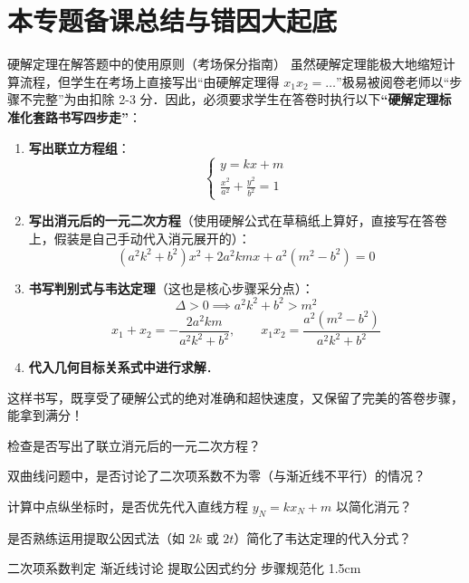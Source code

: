 \documentclass[11pt,a4paper]{ctexart}
\begin{document}
\newpage

\section{本专题备课总结与错因大起底}

\begin{keybox}{硬解定理在解答题中的使用原则（考场保分指南）}
  虽然硬解定理能极大地缩短计算流程，但学生在考场上直接写出“由硬解定理得 $x_1x_2 = \dots$”极易被阅卷老师以“步骤不完整”为由扣除 2-3 分．因此，必须要求学生在答卷时执行以下\textbf{“硬解定理标准化套路书写四步走”}：
  \begin{enumerate}
    \item \textbf{写出联立方程组}：
          \[ \begin{cases} y = kx + m \\ \frac{x^2}{a^2} + \frac{y^2}{b^2} = 1 \end{cases} \]
    \item \textbf{写出消元后的一元二次方程}（使用硬解公式在草稿纸上算好，直接写在答卷上，假装是自己手动代入消元展开的）：
          \[ (a^2k^2 + b^2)x^2 + 2a^2kmx + a^2(m^2-b^2) = 0 \]
    \item \textbf{书写判别式与韦达定理}（这也是核心步骤采分点）：
          \[ \Delta > 0 \implies a^2k^2+b^2 > m^2 \]
          \[ x_1 + x_2 = -\frac{2a^2km}{a^2k^2+b^2},\qquad x_1x_2 = \frac{a^2(m^2-b^2)}{a^2k^2+b^2} \]
    \item \textbf{代入几何目标关系式中进行求解}．
  \end{enumerate}
  这样书写，既享受了硬解公式的绝对准确和超快速度，又保留了完美的答卷步骤，能拿到满分！
\end{keybox}

\begin{postproblem}
  {
    \item 检查是否写出了联立消元后的一元二次方程？
    \item 双曲线问题中，是否讨论了二次项系数不为零（与渐近线不平行）的情况？
    \item 计算中点纵坐标时，是否优先代入直线方程 $y_N = k x_N + m$ 以简化消元？
    \item 是否熟练运用提取公因式法（如 $2k$ 或 $2t$）简化了韦达定理的代入分式？
  }
  {\checkbox 二次项系数判定 \quad \checkbox 渐近线讨论 \quad \checkbox 提取公因式约分 \quad \checkbox 步骤规范化}
  {1.5cm}
\end{postproblem}
\end{document}
